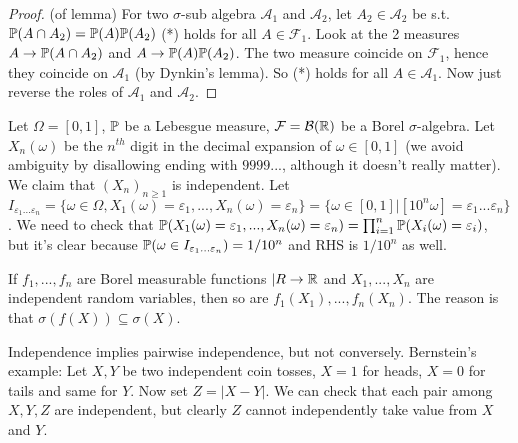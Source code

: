 \documentclass[a4paper]{article}
\begin{document}
\begin{proof} (of lemma)
For two $\sigma$-sub algebra $\mathcal{A}_1$ and $\mathcal{A}_2$, let $A_2 \in \mathcal{A}_2$ be s.t. $\P(A \cap A_2) = \P(A) \P(A_2)$ (*) holds for all $A \in \mathcal{F}_1$. Look at the 2 measures $A \to \P(A \cap A_2)$ and $A \to \P(A) \P(A_2)$. The two measure coincide on $\mathcal{F}_1$, hence they coincide on $\mathcal{A}_1$ (by Dynkin's lemma). So (*) holds for all $A \in \mathcal{A}_1$. Now just reverse the roles of $\mathcal{A}_1$ and $\mathcal{A}_2$.
\end{proof}

\begin{eg}
Let $\Omega =[0,1]$, $\P$ be a Lebesgue measure, $\mathcal{F} = \mathcal{B}(\R)$ be a Borel $\sigma$-algebra. Let $X_n(\omega)$ be the $n^{th}$ digit in the decimal expansion of $\omega \in [0,1]$ (we avoid ambiguity by disallowing ending with $9999...$, although it doesn't really matter). We claim that $(X_n)_{n \geq 1}$ is independent. Let $I_{\varepsilon_1...\varepsilon_n} = \{\omega \in \Omega,X_1(\omega) = \varepsilon_1,...,X_n(\omega) = \varepsilon_n\} = \{\omega \in [0,1] | [10^n \omega] = \varepsilon_1...\varepsilon_n\}$. We need to check that $\P(X_1(\omega) = \varepsilon_1, ..., X_n(\omega) = \varepsilon_n) = \prod_{i=1}^n \P(X_i(\omega) = \varepsilon_i)$, but it's clear because $\P(\omega \in I_{\varepsilon_1...\varepsilon_n}) = 1/10^n$ and RHS is $1/10^n$ as well.
\end{eg}

\begin{rem}
If $f_1,...,f_n$ are Borel measurable functions $|R \to \R$ and $X_1,...,X_n$ are independent random variables, then so are $f_1(X_1),...,f_n(X_n)$. The reason is that $\sigma(f(X)) \subseteq \sigma(X)$.
\end{rem}

\begin{rem}
Independence implies pairwise independence, but not conversely. Bernstein's example: Let $X,Y$ be two independent coin tosses, $X=1$ for heads, $X=0$ for tails and same for $Y$. Now set $Z = |X-Y|$. We can check that each pair among $X,Y,Z$ are independent, but clearly $Z$ cannot independently take value from $X$ and $Y$.
\end{rem}
\end{document}
